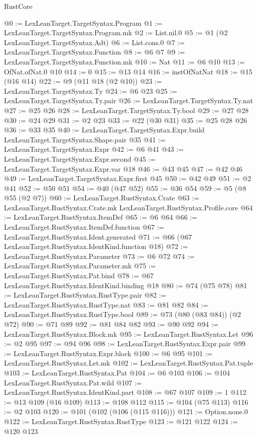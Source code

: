 \begin{lexlean}{RustCore}
\begin{coremodule}
@0 := LexLeanTarget.TargetSyntax.Program
@1 := LexLeanTarget.TargetSyntax.Program.mk
@2 := List.nil.{0}
@5 := @1 (@2 LexLeanTarget.TargetSyntax.Adt)
@6 := List.cons.{0}
@7 := LexLeanTarget.TargetSyntax.Function
@8 := @6 @7
@9 := LexLeanTarget.TargetSyntax.Function.mk
@10 := Nat
@11 := @6 @10
@13 := OfNat.ofNat.{0} @10
@14 := 0
@15 := @13 @14
@16 := instOfNatNat
@18 := @15 (@16 @14)
@22 := @9 (@11 @18 (@2 @10))
@23 := LexLeanTarget.TargetSyntax.Ty
@24 := @6 @23
@25 := LexLeanTarget.TargetSyntax.Ty.pair
@26 := LexLeanTarget.TargetSyntax.Ty.nat
@27 := @25 @26
@28 := LexLeanTarget.TargetSyntax.Ty.bool
@29 := @27 @28
@30 := @24 @29
@31 := @2 @23
@33 := @22 (@30 @31)
@35 := @25 @28 @26
@36 := @33 @35
@40 := LexLeanTarget.TargetSyntax.Expr.build LexLeanTarget.TargetSyntax.Shape.pair @35
@41 := LexLeanTarget.TargetSyntax.Expr
@42 := @6 @41
@43 := LexLeanTarget.TargetSyntax.Expr.second
@45 := LexLeanTarget.TargetSyntax.Expr.var @18
@46 := @43 @45
@47 := @42 @46
@49 := LexLeanTarget.TargetSyntax.Expr.first @45
@50 := @42 @49
@51 := @2 @41
@52 := @50 @51
@54 := @40 (@47 @52)
@55 := @36 @54
@59 := @5 (@8 @55 (@2 @7))
@60 := LexLeanTarget.RustSyntax.Crate
@63 := LexLeanTarget.RustSyntax.Crate.mk LexLeanTarget.RustSyntax.Profile.core
@64 := LexLeanTarget.RustSyntax.ItemDef
@65 := @6 @64
@66 := LexLeanTarget.RustSyntax.ItemDef.function
@67 := LexLeanTarget.RustSyntax.Ident.generated
@71 := @66 (@67 LexLeanTarget.RustSyntax.IdentKind.function @18)
@72 := LexLeanTarget.RustSyntax.Parameter
@73 := @6 @72
@74 := LexLeanTarget.RustSyntax.Parameter.mk
@75 := LexLeanTarget.RustSyntax.Pat.bind
@78 := @67 LexLeanTarget.RustSyntax.IdentKind.binding @18
@80 := @74 (@75 @78)
@81 := LexLeanTarget.RustSyntax.RustType.pair
@82 := LexLeanTarget.RustSyntax.RustType.nat
@83 := @81 @82
@84 := LexLeanTarget.RustSyntax.RustType.bool
@89 := @73 (@80 (@83 @84)) (@2 @72)
@90 := @71 @89
@92 := @81 @84 @82
@93 := @90 @92
@94 := LexLeanTarget.RustSyntax.Block.mk
@95 := LexLeanTarget.RustSyntax.Let
@96 := @2 @95
@97 := @94 @96
@98 := LexLeanTarget.RustSyntax.Expr.pair
@99 := LexLeanTarget.RustSyntax.Expr.block
@100 := @6 @95
@101 := LexLeanTarget.RustSyntax.Let.mk
@102 := LexLeanTarget.RustSyntax.Pat.tuple
@103 := LexLeanTarget.RustSyntax.Pat
@104 := @6 @103
@106 := @104 LexLeanTarget.RustSyntax.Pat.wild
@107 := LexLeanTarget.RustSyntax.IdentKind.part
@108 := @67 @107
@109 := 1
@112 := @13 @109 (@16 @109)
@113 := @108 @112
@115 := @104 (@75 @113)
@116 := @2 @103
@120 := @101 (@102 (@106 (@115 @116)))
@121 := Option.none.{0}
@122 := LexLeanTarget.RustSyntax.RustType
@123 := @121 @122
@124 := @120 @123

\end{coremodule}
\end{lexlean}
